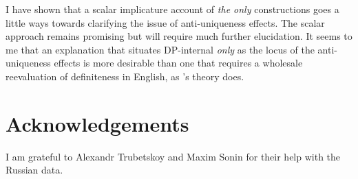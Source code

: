 \documentclass{article}
\begin{document}
I have shown that a scalar implicature account of \textit{the only} constructions goes a little ways towards clarifying the issue of anti-uniqueness effects. The scalar approach remains promising but will require much further elucidation. It seems to me that an explanation that situates DP-internal \textit{only} as the locus of the anti-uniqueness effects is more desirable than one that requires a wholesale reevaluation of definiteness in English, as \citeauthor{cb2015}'s theory does.



\section*{Acknowledgements}
I am grateful to Alexandr Trubetskoy and Maxim Sonin for their help with the Russian data.




\end{document}
